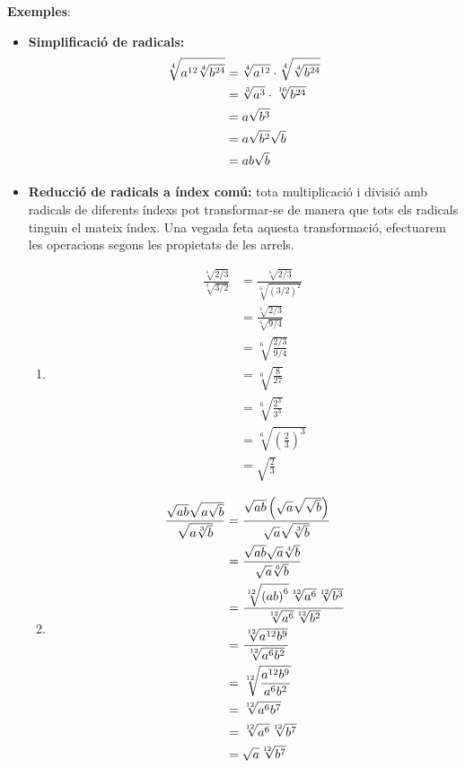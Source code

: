 \textbf{Exemples}:

\begin{itemize}
\item \textbf{Simplificació de radicals:}%
\begin{align*}
\sqrt[4]{a^{12}\sqrt[4]{b^{24}}} &=\sqrt[4]{a^{12}}\cdot \sqrt[4]{\sqrt[4]{%
b^{24}}} \\
&=\sqrt[3]{a^{3}}\cdot \sqrt[16]{b^{24}} \\
&=a\sqrt{b^{3}} \\
&=a\sqrt{b^{2}}\sqrt{b} \\
&=ab\sqrt{b}
\end{align*}

\item \textbf{Reducció de radicals a índex comú:} tota
multiplicació i divisió amb radicals de diferents índexs
pot transformar-se de manera que tots els radicals tinguin el mateix índex. Una vegada feta aquesta transformació, efectuarem les operacions
segons les propietats de les arrels.

\begin{enumerate}
\item 
\begin{align*}
\frac{\sqrt[6]{2/3}}{\sqrt[3]{3/2}} &=\frac{\sqrt[6]{2/3}}{\sqrt[6]{\left(
3/2\right) ^{2}}} \\
&=\frac{\sqrt[6]{2/3}}{\sqrt[6]{9/4}} \\
&=\sqrt[6]{\frac{2/3}{9/4}} \\
&=\sqrt[6]{\frac{8}{27}} \\
&=\sqrt[6]{\frac{2^{3}}{3^{3}}} \\
&=\sqrt[6]{\left( \frac{2}{3}\right) ^{3}} \\
&=\sqrt{\frac{2}{3}}
\end{align*}

\item 
\begin{align*}
\frac{\sqrt{ab}\sqrt{a\sqrt{b}}}{\sqrt{a\sqrt[3]{b}}} &=\frac{\sqrt{ab}%
\left( \sqrt{a}\sqrt{\sqrt{b}}\right) }{\sqrt{a}\sqrt{\sqrt[3]{b}}} \\
&=\frac{\sqrt{ab}\sqrt{a}\sqrt[4]{b}}{\sqrt{a}\sqrt[6]{b}} \\
&=\frac{\sqrt[12]{\left( ab\right) ^{6}}\sqrt[12]{a^{6}}\sqrt[12]{b^{3}}}{%
\sqrt[12]{a^{6}}\sqrt[12]{b^{2}}} \\
&=\frac{\sqrt[12]{a^{12}b^{9}}}{\sqrt[12]{a^{6}b^{2}}} \\
&=\sqrt[12]{\frac{a^{12}b^{9}}{a^{6}b^{2}}} \\
&=\sqrt[12]{a^{6}b^{7}} \\
&=\sqrt[12]{a^{6}}\sqrt[12]{b^{7}} \\
&=\sqrt{a}\sqrt[12]{b^{7}}
\end{align*}
\end{enumerate}


\end{itemize}
